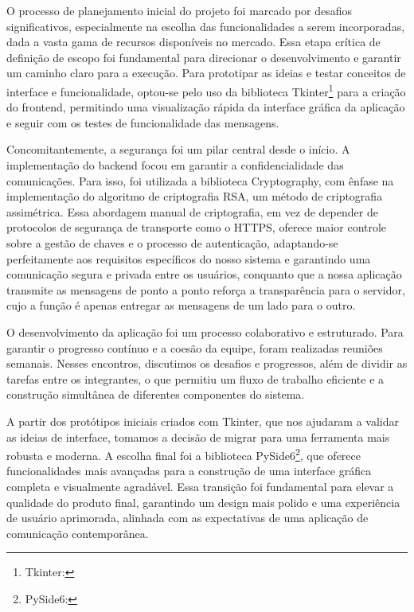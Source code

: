 O processo de planejamento inicial do projeto foi marcado por
desafios significativos, especialmente na escolha das funcionalidades
a serem incorporadas, dada a vasta gama de recursos disponíveis no
mercado. Essa etapa crítica de definição de escopo foi fundamental
para direcionar o desenvolvimento e garantir um caminho claro para a
execução. Para prototipar as ideias e testar conceitos de interface e
funcionalidade, optou-se pelo uso da biblioteca Tkinter\footnote{Tkinter:
} para a
criação do frontend, permitindo uma visualização rápida da interface
gráfica da aplicação e seguir com os testes de funcionalidade das mensagens.

Concomitantemente, a segurança foi um pilar central desde o início. A
implementação do backend focou em garantir a confidencialidade das
comunicações. Para isso, foi utilizada a biblioteca Cryptography, com
ênfase na implementação do algoritmo de criptografia \acs{RSA}, um método
de criptografia assimétrica. Essa abordagem manual de criptografia,
em vez de depender de protocolos de segurança de transporte como o
\acs{HTTPS}, oferece maior controle sobre a gestão de chaves e o processo
de autenticação, adaptando-se perfeitamente aos requisitos
específicos do nosso sistema e garantindo uma comunicação segura e
privada entre os usuários, conquanto que a nossa aplicação transmite
as mensagens de ponto a ponto reforça a transparência para o
servidor, cujo a função é apenas entregar as mensagens de um lado para o outro.

O desenvolvimento da aplicação foi um processo colaborativo e
estruturado. Para garantir o progresso contínuo e a coesão da equipe,
foram realizadas reuniões semanais. Nesses encontros, discutimos os
desafios e progressos, além de dividir as tarefas entre os
integrantes, o que permitiu um fluxo de trabalho eficiente e a
construção simultânea de diferentes componentes do sistema.

A partir dos protótipos iniciais criados com Tkinter, que nos
ajudaram a validar as ideias de interface, tomamos a decisão de
migrar para uma ferramenta mais robusta e moderna. A escolha final
foi a biblioteca PySide6\footnote{PySide6:
}, que oferece funcionalidades
mais avançadas
para a construção de uma interface gráfica completa e visualmente
agradável. Essa transição foi fundamental para elevar a qualidade do
produto final, garantindo um design mais polido e uma experiência de
usuário aprimorada, alinhada com as expectativas de uma aplicação de
comunicação contemporânea.

